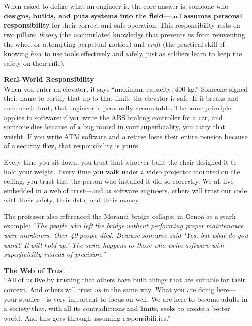 When asked to define what an engineer is, the core answer is: someone who \textbf{designs, builds, and puts systems into the field}---and \textbf{assumes personal responsibility} for their correct and safe operation. This responsibility rests on two pillars: \emph{theory} (the accumulated knowledge that prevents us from reinventing the wheel or attempting perpetual motion) and \emph{craft} (the practical skill of knowing \emph{how} to use tools effectively and safely, just as soldiers learn to keep the safety on their rifle).

\begin{warningbox}
\textbf{Real-World Responsibility} \\
When you enter an elevator, it says ``maximum capacity: 400 kg.'' Someone signed their name to certify that up to that limit, the elevator is safe. If it breaks and someone is hurt, that engineer is personally accountable. The same principle applies to software: if you write the ABS braking controller for a car, and someone dies because of a bug rooted in your superficiality, you carry that weight. If you write ATM software and a retiree loses their entire pension because of a security flaw, that responsibility is yours.
\end{warningbox}

Every time you sit down, you trust that whoever built the chair designed it to hold your weight. Every time you walk under a video projector mounted on the ceiling, you trust that the person who installed it did so correctly. We all live embedded in a web of trust---and as software engineers, others will trust our code with their safety, their data, and their money.

The professor also referenced the Morandi bridge collapse in Genoa as a stark example: \emph{``The people who left the bridge without performing proper maintenance were murderers. Over 40 people died. Because someone said `Yes, but what do you want? It will hold up.' The same happens to those who write software with superficiality instead of precision.''}

\begin{insightbox}
\textbf{The Web of Trust} \\
``All of us live by trusting that others have built things that are suitable for their context. And others will trust \emph{us} in the same way. What you are doing here---your studies---is very important to focus on well. We are here to become adults in a society that, with all its contradictions and limits, seeks to create a better world. And this goes through assuming responsibilities.''
\end{insightbox}

